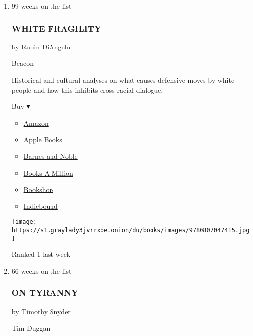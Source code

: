\begin{enumerate}
\def\labelenumi{\arabic{enumi}.}
\item
  99 weeks on the list

  \hypertarget{white-fragility}{%
  \subsubsection{WHITE FRAGILITY}\label{white-fragility}}

  by Robin DiAngelo

  Beacon

  Historical and cultural analyses on what causes defensive moves by
  white people and how this inhibits cross-racial dialogue.

  Buy ▾

  \begin{itemize}
  \tightlist
  \item
    \href{https://www.amazon.com/White-Fragility-People-About-Racism/dp/0807047414?tag=NYTBS-20}{Amazon}
  \item
    \href{https://du-gae-books-dot-nyt-du-prd.appspot.com/buy?title=WHITE+FRAGILITY\&author=Robin+DiAngelo}{Apple
    Books}
  \item
    \href{https://www.anrdoezrs.net/click-7990613-11819508?url=https\%3A\%2F\%2Fwww.barnesandnoble.com\%2Fw\%2F\%3Fean\%3D9780807047415}{Barnes
    and Noble}
  \item
    \href{https://www.anrdoezrs.net/click-7990613-35140?url=https\%3A\%2F\%2Fwww.booksamillion.com\%2Fp\%2FWHITE\%2BFRAGILITY\%2FRobin\%2BDiAngelo\%2F9780807047415}{Books-A-Million}
  \item
    \href{https://bookshop.org/a/3546/9780807047415}{Bookshop}
  \item
    \href{https://www.indiebound.org/book/9780807047415?aff=NYT}{Indiebound}
  \end{itemize}

  \texttt{[image: https://s1.graylady3jvrrxbe.onion/du/books/images/9780807047415.jpg]}

  Ranked 1 last week
\item
  66 weeks on the list

  \hypertarget{on-tyranny}{%
  \subsubsection{ON TYRANNY}\label{on-tyranny}}

  by Timothy Snyder

  Tim Duggan


\end{enumerate}

